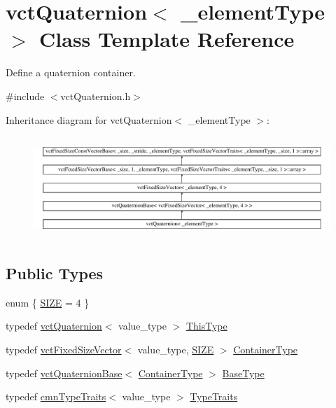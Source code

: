 \hypertarget{classvct_quaternion}{}\section{vct\+Quaternion$<$ \+\_\+element\+Type $>$ Class Template Reference}
\label{classvct_quaternion}


Define a quaternion container.  




{\ttfamily \#include $<$vct\+Quaternion.\+h$>$}

Inheritance diagram for vct\+Quaternion$<$ \+\_\+element\+Type $>$\+:\begin{figure}[H]
\begin{center}
\leavevmode
\includegraphics[height=3.888889cm]{d7/de5/classvct_quaternion}
\end{center}
\end{figure}
\subsection*{Public Types}
\begin{DoxyCompactItemize}
\item 
enum \{ \hyperlink{group__cisst_vector_ggafa19be877555ceeedba0f4e910b22e51a12aabd231905465cec7ef73c8b4c043f}{S\+I\+Z\+E} = 4
 \}
\item 
typedef \hyperlink{classvct_quaternion}{vct\+Quaternion}$<$ value\+\_\+type $>$ \hyperlink{classvct_quaternion_a07e736b9769c53c9261fd2f4c79bf4c1}{This\+Type}
\item 
typedef \hyperlink{classvct_fixed_size_vector}{vct\+Fixed\+Size\+Vector}$<$ value\+\_\+type, \hyperlink{group__cisst_vector_ggafa19be877555ceeedba0f4e910b22e51a12aabd231905465cec7ef73c8b4c043f}{S\+I\+Z\+E} $>$ \hyperlink{classvct_quaternion_ac536cb4b97d3759e26fd33094a3630fa}{Container\+Type}
\item 
typedef \hyperlink{classvct_quaternion_base}{vct\+Quaternion\+Base}$<$ \hyperlink{classvct_quaternion_ac536cb4b97d3759e26fd33094a3630fa}{Container\+Type} $>$ \hyperlink{classvct_quaternion_a6904ddafc9719f3ba49ffd08dc0b0702}{Base\+Type}
\item 
typedef \hyperlink{classcmn_type_traits}{cmn\+Type\+Traits}$<$ value\+\_\+type $>$ \hyperlink{classvct_quaternion_a7a67c4eef1358c2853db271c468a1c03}{Type\+Traits}
\end{DoxyCompactItemize}
